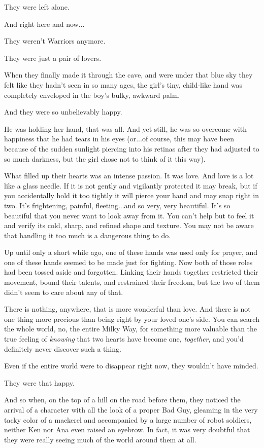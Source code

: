 \documentclass[
]{article}
\begin{document}
They were left alone.

And right here and now...

They weren't Warriors anymore.

They were just a pair of lovers.

When they finally made it through the cave, and were under that blue sky
they felt like they hadn't seen in so many ages, the girl's tiny,
child-like hand was completely enveloped in the boy's bulky, awkward
palm.

And they were so unbelievably happy.

He was holding her hand, that was all. And yet still, he was so overcome
with happiness that he had tears in his eyes (or...of course, this may
have been because of the sudden sunlight piercing into his retinas after
they had adjusted to so much darkness, but the girl chose not to think
of it this way).

What filled up their hearts was an intense passion. It was love. And
love is a lot like a glass needle. If it is not gently and vigilantly
protected it may break, but if you accidentally hold it too tightly it
will pierce your hand and may snap right in two. It's frightening,
painful, fleeting...and so very, very beautiful. It's so beautiful that
you never want to look away from it. You can't help but to feel it and
verify its cold, sharp, and refined shape and texture. You may not be
aware that handling it too much is a dangerous thing to do.

Up until only a short while ago, one of these hands was used only for
prayer, and one of these hands seemed to be made just for fighting. Now
both of those roles had been tossed aside and forgotten. Linking their
hands together restricted their movement, bound their talents, and
restrained their freedom, but the two of them didn't seem to care about
any of that.

There is nothing, anywhere, that is more wonderful than love. And there
is not one thing more precious than being right by your loved one's
side. You can search the whole world, no, the entire Milky Way, for
something more valuable than the true feeling of \emph{knowing} that two
hearts have become one, \emph{together}, and you'd definitely never
discover such a thing.

Even if the entire world were to disappear right now, they wouldn't have
minded.

They were that happy.

And so when, on the top of a hill on the road before them, they noticed
the arrival of a character with all the look of a proper Bad Guy,
gleaming in the very tacky color of a mackerel and accompanied by a
large number of robot soldiers, neither Ken nor Ana even raised an
eyebrow. In fact, it was very doubtful that they were really seeing much
of the world around them at all.
\end{document}
